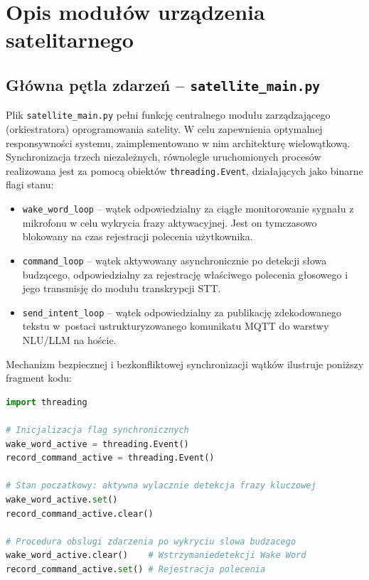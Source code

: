 \documentclass[12pt,a4paper]{article}
\begin{document}
\section{Opis modułów urządzenia satelitarnego}

\subsection{Główna pętla zdarzeń – \texttt{satellite\_main.py}}
Plik \texttt{satellite\_main.py} pełni funkcję centralnego modułu zarządzającego (orkiestratora) oprogramowania satelity. W celu zapewnienia optymalnej responsywności systemu, zaimplementowano w nim architekturę wielowątkową. Synchronizacja trzech niezależnych, równolegle uruchomionych procesów realizowana jest za pomocą obiektów \texttt{threading.Event}, działających jako binarne flagi stanu:
\begin{itemize}
    \item \texttt{wake\_word\_loop} – wątek odpowiedzialny za ciągłe monitorowanie sygnału z mikrofonu w celu wykrycia frazy aktywacyjnej. Jest on tymczasowo blokowany na czas rejestracji polecenia użytkownika.
    \item \texttt{command\_loop} – wątek aktywowany asynchronicznie po detekcji słowa budzącego, odpowiedzialny za rejestrację właściwego polecenia głosowego i jego transmisję do modułu transkrypcji STT.
    \item \texttt{send\_intent\_loop} – wątek odpowiedzialny za publikację zdekodowanego tekstu w~postaci ustrukturyzowanego komunikatu MQTT do warstwy NLU/LLM na hoście.
\end{itemize}

Mechanizm bezpiecznej i bezkonfliktowej synchronizacji wątków ilustruje poniższy fragment kodu:

\begin{center}
\begin{minipage}{0.85\textwidth}
\begin{lstlisting}[language=Python]
import threading

# Inicjalizacja flag synchronicznych
wake_word_active = threading.Event()
record_command_active = threading.Event()

# Stan poczatkowy: aktywna wylacznie detekcja frazy kluczowej
wake_word_active.set()
record_command_active.clear()

# Procedura obslugi zdarzenia po wykryciu slowa budzacego
wake_word_active.clear()    # Wstrzymaniedetekcji Wake Word
record_command_active.set() # Rejestracja polecenia
\end{lstlisting}
\end{minipage}
\end{center}
\end{document}
